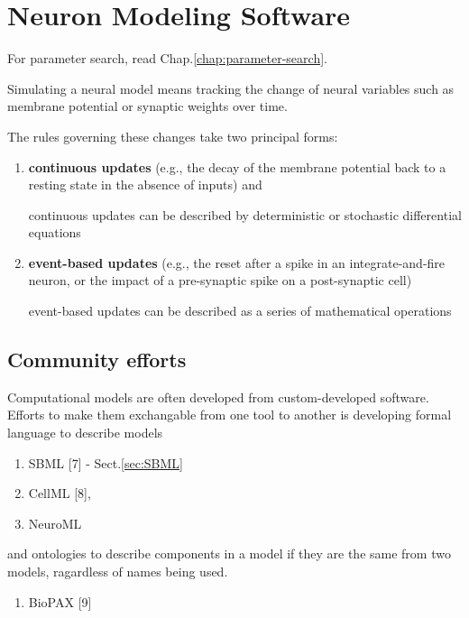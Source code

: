\chapter{Neuron Modeling Software}
\label{chap:software-modeling-Neurons}

For parameter search, read Chap.\ref{chap:parameter-search}.

Simulating a neural model means tracking the change of neural
variables such as membrane potential or synaptic weights over
time.

The rules governing these changes take two principal forms:
\begin{enumerate}
  
  \item  {\bf continuous updates} (e.g., the decay of the membrane potential
  back to a resting state in the absence of inputs) and 

continuous updates can be described by deterministic
or stochastic differential equations
  
  \item {\bf event-based updates} (e.g., the reset after a spike in an
  integrate-and-fire neuron, or the impact of a pre-synaptic spike on a
  post-synaptic cell) 

event-based updates can
be described as a series of mathematical operations
\end{enumerate}




\section{Community efforts}

Computational models are often developed from custom-developed software.
Efforts to make them exchangable from one tool to another is developing formal
language to describe models
\begin{enumerate}
  \item SBML [7] - Sect.\ref{sec:SBML}
  
  \item CellML [8],
  
  \item NeuroML
\end{enumerate}

and ontologies to describe components in a model if they are the same from two
models, ragardless of names being used.
\begin{enumerate}
  \item  BioPAX [9] 
\end{enumerate}


